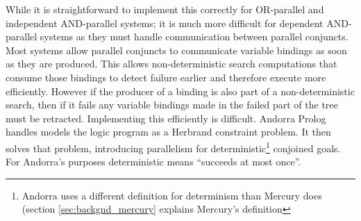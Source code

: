 While it is straightforward to implement this correctly for OR-parallel
and independent AND-parallel systems;
it is much more difficult for dependent AND-parallel systems as
they must handle communication between parallel conjuncts.
Most systems allow parallel conjuncts to communicate variable bindings as
soon as they are produced.
This allows non-deterministic search computations that consume those bindings to
detect failure earlier and therefore execute more efficiently.
However if the producer of a binding is also part of a non-deterministic
search,
then if it fails any variable bindings made in the failed part of the tree
must be retracted.
Implementing this efficiently is difficult.
Andorra Prolog \citep{haridi:1990:andorra} handles models the
logic program as a Herbrand constraint problem.
It then solves that problem, introducing parallelism for
deterministic\footnote{
    Andorra uses a different definition for determinism than Mercury does
    (section \ref{sec:backgnd_mercury} explains Mercury's definition}
conjoined goals.
For Andorra's purposes deterministic means ``succeeds at most once''.

